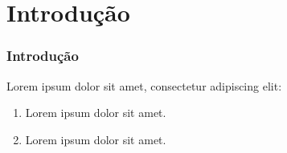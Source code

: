 \section{Introdução} %


\begin{frame}
	\frametitle{Introdução}
     Lorem ipsum dolor sit amet, consectetur adipiscing elit:
    \begin{enumerate}
        \item Lorem ipsum dolor sit amet.
        \item Lorem ipsum dolor sit amet.
    \end{enumerate}
	
\end{frame}

